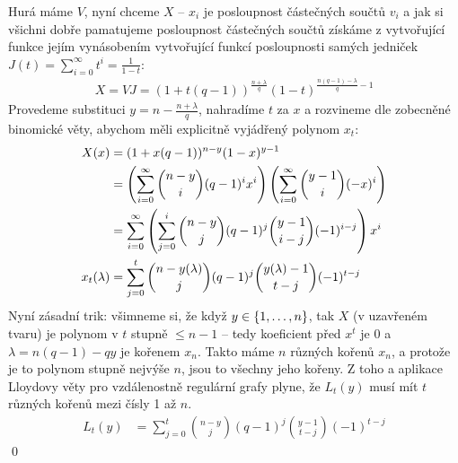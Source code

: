 Hurá máme $V$, nyní chceme $X$ -- $x_i$ je posloupnost částečných součtů
$v_i$ a jak si všichni dobře pamatujeme posloupnost částečných součtů získáme
z vytvořující funkce jejím vynásobením vytvořující funkcí posloupnosti samých jedniček
$J(t) = \sum_{i=0}^\infty t^i = \frac{1}{1-t}$:
\begin{align}
  X = VJ =  (1 + t(q-1))^{\frac{n + \lambda}{q}} (1 - t)^{\frac{n(q-1) - \lambda}{q} - 1}
\end{align}
Provedeme substituci $y = n - \frac{n + \lambda}{q}$, nahradíme $t$ za $x$
a rozvineme dle zobecněné binomické věty, abychom měli explicitně vyjádřený
polynom $x_t$:
\begin{align}
  X(x) &= (1 + x(q-1))^{n - y} (1 - x)^{y - 1} \\
       &= \br{\sum_{i=0}^\infty {n - y \choose i} (q-1)^i x^i}
          \br{\sum_{i=0}^\infty {y - 1 \choose i} (-x)^i } \\
       &= \sum_{i=0}^\infty \br{\sum_{j=0}^i {n - y \choose j} (q-1)^j
                                {y - 1 \choose i - j} (-1)^{i-j}} x^i \\
%
  x_t(\lambda) &= \sum_{j=0}^t {n - y(\lambda) \choose j} (q-1)^j
                                {y(\lambda) - 1 \choose t - j} (-1)^{t-j}
\end{align}
Nyní zásadní trik: všimneme si, že když $y \in \left\{1, \ldots, n\right\}$, tak
$X$ (v uzavřeném tvaru) je polynom v $t$ stupně $\leq n - 1$ --
tedy koeficient před $x^t$ je 0
a $\lambda = n(q-1) - qy$ je kořenem $x_n$. Takto máme $n$ různých kořenů
$x_n$, a protože je to polynom stupně nejvýše $n$, jsou to všechny jeho kořeny.
Z toho a aplikace Lloydovy věty pro vzdálenostně regulární grafy plyne,
že $L_t(y)$ musí mít $t$ různých kořenů mezi čísly 1 až $n$.
\begin{align}
  L_t(y) &= \sum_{j=0}^t {n - y \choose j} (q-1)^j
                                {y - 1 \choose t - j} (-1)^{t-j}
\end{align}
\qed

